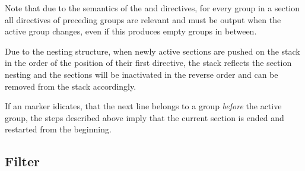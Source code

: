 Note that due to the semantics of the  and  directives, for every group in a section all
directives of preceding groups are relevant and must be output when the active group changes, even if this produces 
empty groups in between.

Due to the nesting structure, when newly active sections are pushed on the stack in the order of the position of their
first directive, the stack reflects the section nesting and the sections will be inactivated in the reverse order and
can be removed from the stack accordingly.

If an  marker idicates, that the next line belongs to a group \textit{before} the active group, the
steps described above imply that the current section is ended and restarted from the beginning.

\subsection{Filter }

